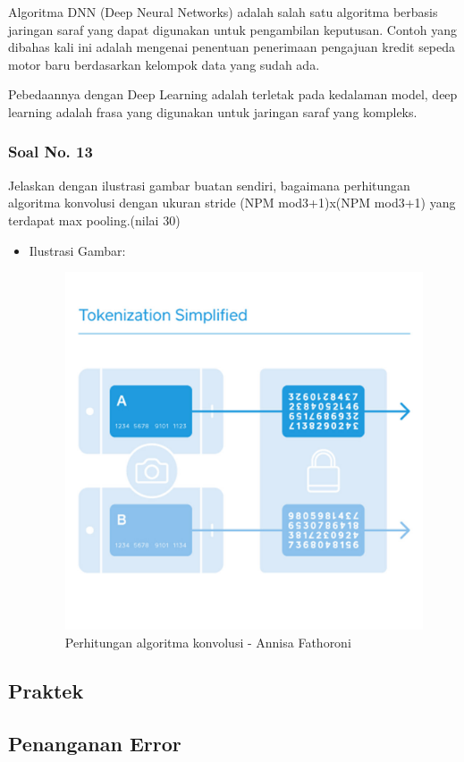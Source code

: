 \hfill \break
Algoritma DNN (Deep Neural Networks) adalah salah satu algoritma berbasis jaringan saraf yang dapat digunakan untuk pengambilan keputusan. Contoh yang dibahas kali ini adalah mengenai penentuan penerimaan pengajuan kredit sepeda motor baru berdasarkan kelompok data yang sudah ada.

Pebedaannya dengan Deep Learning adalah terletak pada kedalaman model, deep learning adalah frasa yang digunakan untuk jaringan saraf yang kompleks.

\subsubsection{Soal No. 13}
Jelaskan dengan ilustrasi gambar buatan sendiri, bagaimana perhitungan algoritma konvolusi dengan ukuran stride (NPM mod3+1)x(NPM mod3+1) yang terdapat max pooling.(nilai 30)

\begin{itemize}
    \item Ilustrasi Gambar:

    \begin{figure}[!hbtp]
    \centering
    \includegraphics[scale=0.4]{figures/Chapter 7/1164067/Teori/Chapter7AnnisaFathoroni1.jpg}
    \caption{Perhitungan algoritma konvolusi - Annisa Fathoroni}
    \label{Perhitungan algoritma konvolusi - Annisa Fathoroni}
    \end{figure}
\end{itemize}

\subsection{Praktek}


\subsection{Penanganan Error}
